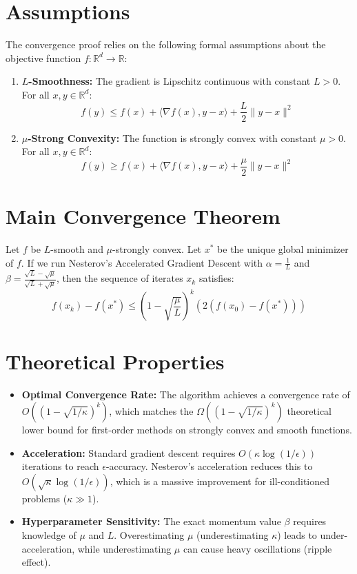 \documentclass[11pt]{article}
\begin{document}
\section*{Assumptions}
The convergence proof relies on the following formal assumptions about the objective function $f: \mathbb{R}^d \to \mathbb{R}$:
\begin{enumerate}
    \item \textbf{$L$-Smoothness:} The gradient is Lipschitz continuous with constant $L > 0$. For all $x, y \in \mathbb{R}^d$:
    $$f(y) \le f(x) + \langle \nabla f(x), y - x \rangle + \frac{L}{2} \|y - x\|^2$$
    \item \textbf{$\mu$-Strong Convexity:} The function is strongly convex with constant $\mu > 0$. For all $x, y \in \mathbb{R}^d$:
    $$f(y) \ge f(x) + \langle \nabla f(x), y - x \rangle + \frac{\mu}{2} \|y - x\|^2$$
\end{enumerate}

\section*{Main Convergence Theorem}
Let $f$ be $L$-smooth and $\mu$-strongly convex. Let $x^*$ be the unique global minimizer of $f$. If we run Nesterov's Accelerated Gradient Descent with $\alpha = \frac{1}{L}$ and $\beta = \frac{\sqrt{L}-\sqrt{\mu}}{\sqrt{L}+\sqrt{\mu}}$, then the sequence of iterates $x_k$ satisfies:
$$f(x_k) - f(x^*) \le \left(1 - \sqrt{\frac{\mu}{L}}\right)^k \left( 2(f(x_0) - f(x^*)) \right)$$

\section*{Theoretical Properties}
\begin{itemize}
    \item \textbf{Optimal Convergence Rate:} The algorithm achieves a convergence rate of $O\left((1 - \sqrt{1/\kappa})^k\right)$, which matches the $\Omega\left((1 - \sqrt{1/\kappa})^k\right)$ theoretical lower bound for first-order methods on strongly convex and smooth functions.
    \item \textbf{Acceleration:} Standard gradient descent requires $O(\kappa \log(1/\epsilon))$ iterations to reach $\epsilon$-accuracy. Nesterov's acceleration reduces this to $O(\sqrt{\kappa} \log(1/\epsilon))$, which is a massive improvement for ill-conditioned problems ($\kappa \gg 1$).
    \item \textbf{Hyperparameter Sensitivity:} The exact momentum value $\beta$ requires knowledge of $\mu$ and $L$. Overestimating $\mu$ (underestimating $\kappa$) leads to under-acceleration, while underestimating $\mu$ can cause heavy oscillations (ripple effect).
\end{itemize}
\end{document}
